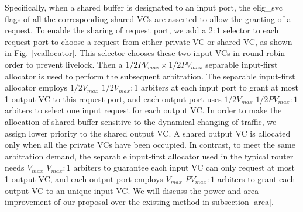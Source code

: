 \documentclass[10pt,conference]{IEEEtran}
\begin{document}
Specifically, when a shared buffer is designated to an input port, the elig\_svc flags of all the corresponding shared VCs are asserted to allow the granting of a request. To enable the sharing of request port, we add a $2:1$ selector to each request port to choose a request from either private VC or shared VC, as shown in Fig. \ref{vcallocator}. This selector chooses these two input VCs in round-robin order to prevent livelock. Then a $1/2PV_{max}\times 1/2PV_{max}$ separable input-first allocator \cite{DaTo04} is used to perform the subsequent arbitration. The separable input-first allocator employs $1/2V_{max}$ $1/2V_{max}:1$ arbiters at each input port to grant at most 1 output VC to this request port, and each output port uses $1/2V_{max}$ $1/2PV_{max}:1$ arbiters to select one input request for each output VC. In order to make the allocation of shared buffer sensitive to the dynamical changing of traffic, we assign lower priority to the shared output VC. A shared output VC is allocated only when all the private VCs have been occupied. In contrast, to meet the same arbitration demand, the separable input-first allocator used in the typical router needs $V_{max}$ $V_{max}:1$ arbiters to guarantee each input VC can only request at most 1 output VC, and each output port employs $V_{max}$ $PV_{max}:1$ arbiters to grant each output VC to an unique input VC. We will discuss the power and area improvement of our proposal over the existing method in subsection \ref{area}.

\end{document}

